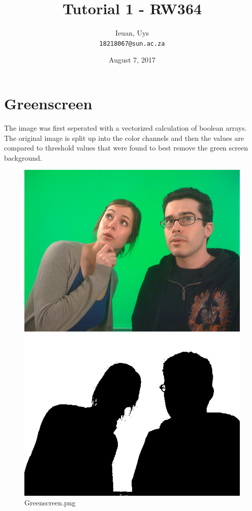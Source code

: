\documentclass{article}
\date{August 7, 2017}
\title{Tutorial 1 - RW364}
\author{
  Ieuan, Uys\\
  \texttt{18218067@sun.ac.za}
}
\begin{document}
\maketitle

\section{Greenscreen}
The image was first seperated with a vectorized calculation of boolean arrays. The original image is split up into the color channels and then the values are compared to threshold values that were found to best remove the green screen background.



\begin{figure}[h!]
\centering
  \begin{minipage}[b]{0.3\textwidth}
    \includegraphics[width=\textwidth]{greenscreen.jpg}
    \caption{Greenscreen.png}
  \end{minipage}
  \hfill
  \begin{minipage}[b]{0.3\textwidth}
    \includegraphics[width=\textwidth]{Q1_1.png}

\end{minipage}
\end{figure}
\end{document}
